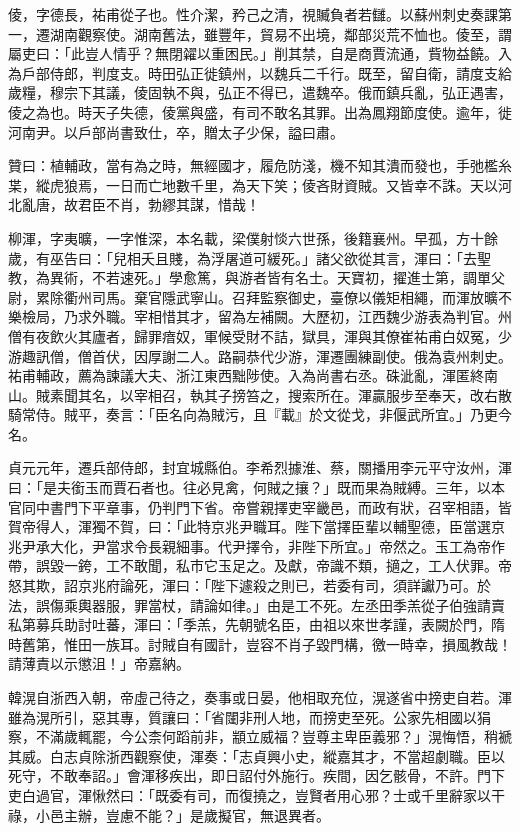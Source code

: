 \begin{pinyinscope}
 倰，字德長，祐甫從子也。性介潔，矜己之清，視贓負者若讎。以蘇州刺史奏課第一，遷湖南觀察使。湖南舊法，雖豐年，貿易不出境，鄰部災荒不恤也。倰至，謂屬吏曰：「此豈人情乎？無閉糴以重困民。」削其禁，自是商賈流通，貲物益饒。入為戶部侍郎，判度支。時田弘正徙鎮州，以魏兵二千行。既至，留自衛，請度支給歲糧，穆宗下其議，倰固執不與，弘正不得已，遣魏卒。俄而鎮兵亂，弘正遇害，倰之為也。時天子失德，倰黨與盛，有司不敢名其罪。出為鳳翔節度使。逾年，徙河南尹。以戶部尚書致仕，卒，贈太子少保，謚曰肅。



 贊曰：植輔政，當有為之時，無經國才，履危防淺，機不知其潰而發也，手弛檻糸枼，縱虎狼焉，一日而亡地數千里，為天下笑；倰吝財資賊。又皆幸不誅。天以河北亂唐，故君臣不肖，勃繆其謀，惜哉！



 柳渾，字夷曠，一字惟深，本名載，梁僕射惔六世孫，後籍襄州。早孤，方十餘歲，有巫告曰：「兒相夭且賤，為浮屠道可緩死。」諸父欲從其言，渾曰：「去聖教，為異術，不若速死。」學愈篤，與游者皆有名士。天寶初，擢進士第，調單父尉，累除衢州司馬。棄官隱武寧山。召拜監察御史，臺僚以儀矩相繩，而渾放曠不樂檢局，乃求外職。宰相惜其才，留為左補闕。大歷初，江西魏少游表為判官。州僧有夜飲火其廬者，歸罪瘖奴，軍候受財不詰，獄具，渾與其僚崔祐甫白奴冤，少游趣訊僧，僧首伏，因厚謝二人。路嗣恭代少游，渾遷團練副使。俄為袁州刺史。祐甫輔政，薦為諫議大夫、浙江東西黜陟使。入為尚書右丞。硃泚亂，渾匿終南山。賊素聞其名，以宰相召，執其子搒笞之，搜索所在。渾贏服步至奉天，改右散騎常侍。賊平，奏言：「臣名向為賊污，且『載』於文從戈，非偃武所宜。」乃更今名。



 貞元元年，遷兵部侍郎，封宜城縣伯。李希烈據淮、蔡，關播用李元平守汝州，渾曰：「是夫銜玉而賈石者也。往必見禽，何賊之攘？」既而果為賊縛。三年，以本官同中書門下平章事，仍判門下省。帝嘗親擇吏宰畿邑，而政有狀，召宰相語，皆賀帝得人，渾獨不賀，曰：「此特京兆尹職耳。陛下當擇臣輩以輔聖德，臣當選京兆尹承大化，尹當求令長親細事。代尹擇令，非陛下所宜。」帝然之。玉工為帝作帶，誤毀一銙，工不敢聞，私市它玉足之。及獻，帝識不類，擿之，工人伏罪。帝怒其欺，詔京兆府論死，渾曰：「陛下遽殺之則已，若委有司，須詳讞乃可。於法，誤傷乘輿器服，罪當杖，請論如律。」由是工不死。左丞田季羔從子伯強請賣私第募兵助討吐蕃，渾曰：「季羔，先朝號名臣，由祖以來世孝謹，表闕於門，隋時舊第，惟田一族耳。討賊自有國計，豈容不肖子毀門構，徼一時幸，損風教哉！請薄責以示懲沮！」帝嘉納。



 韓滉自浙西入朝，帝虛己待之，奏事或日晏，他相取充位，滉遂省中搒吏自若。渾雖為滉所引，惡其專，質讓曰：「省闥非刑人地，而搒吏至死。公家先相國以狷察，不滿歲輒罷，今公柰何蹈前非，顓立威福？豈尊主卑臣義邪？」滉悔悟，稍褫其威。白志貞除浙西觀察使，渾奏：「志貞興小史，縱嘉其才，不當超劇職。臣以死守，不敢奉詔。」會渾移疾出，即日詔付外施行。疾間，因乞骸骨，不許。門下吏白過官，渾愀然曰：「既委有司，而復撓之，豈賢者用心邪？士或千里辭家以干祿，小邑主辦，豈慮不能？」是歲擬官，無退異者。




\end{pinyinscope}
